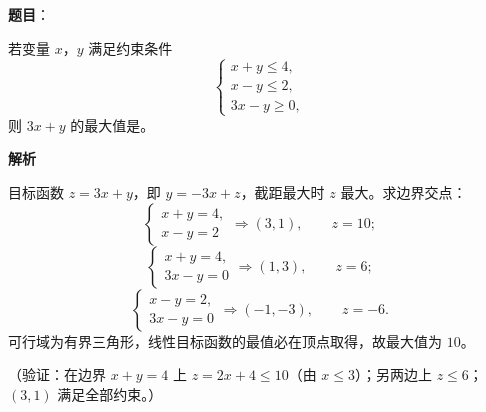 \begin{answer}

\textbf{题目}：

若变量 \(x\)，\(y\) 满足约束条件
\nopagebreak[4]
\[
\begin{cases}
x+y\leqslant4,\\
x-y\leqslant2,\\
3x-y\geqslant0,
\end{cases}
\]
则 \(3x+y\) 的最大值是\gkblank{}。

\textbf{解析}

目标函数 \(z=3x+y\)，即 \(y=-3x+z\)，截距最大时 \(z\) 最大。求边界交点：
\nopagebreak[4]
\[
\begin{cases}x+y=4,\\ x-y=2\end{cases}\Rightarrow(3,1),\qquad z=10;
\]
\nopagebreak[4]
\[
\begin{cases}x+y=4,\\ 3x-y=0\end{cases}\Rightarrow(1,3),\qquad z=6;
\]
\nopagebreak[4]
\[
\begin{cases}x-y=2,\\ 3x-y=0\end{cases}\Rightarrow(-1,-3),\qquad z=-6.
\]
可行域为有界三角形，线性目标函数的最值必在顶点取得，故最大值为 \(10\)。

（验证：在边界 \(x+y=4\) 上 \(z=2x+4\leqslant10\)（由 \(x\leqslant3\)）；另两边上 \(z\leqslant6\)；\((3,1)\) 满足全部约束。）


\end{answer}
